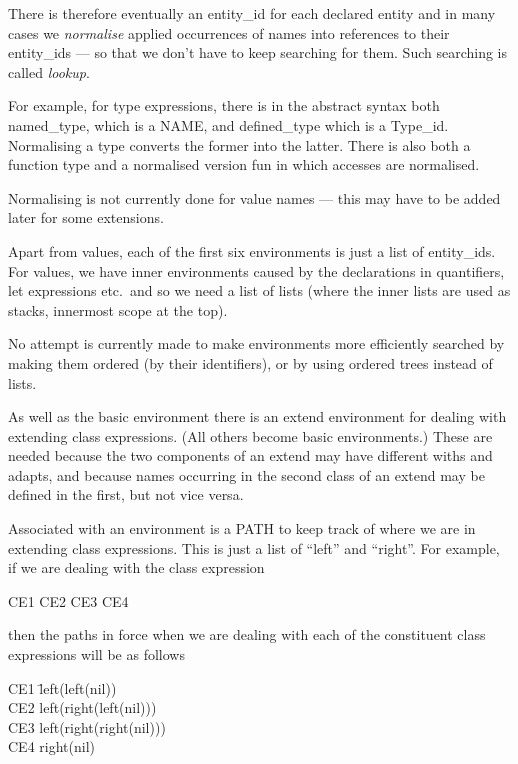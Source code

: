 \documentclass[a4paper]{article}
\begin{document}
There is therefore eventually an entity\_id for each declared entity
and in many cases we \emph{normalise} applied occurrences of names
into references to their entity\_ids --- so that we don't have to keep
searching for them.  Such searching is called \emph{lookup}.  

For example, for type expressions, there is in the abstract syntax
both named\_type, which is a NAME, and defined\_type which is a
Type\_id.  Normalising a type converts the former into the latter.
There is also both a function type and a normalised version fun in which
accesses are normalised.  

Normalising is not currently done for value names --- this may have to
be added later for some extensions.

Apart from values, each of the first six environments is just a list
of entity\_ids.  For values, we have inner environments caused by the
declarations in quantifiers, let expressions etc.\ and so we need a
list of lists (where the inner lists are used as stacks, innermost
scope at the top).

No attempt is currently made to make environments more efficiently searched by
making them ordered (by their identifiers), or by using ordered trees
instead of lists. 

As well as the basic environment there is an extend environment for
dealing with extending class expressions.  (All others become basic
environments.)  These are needed because the two components of an
extend may have different withs and adapts, and because names
occurring in the second class of an extend may be defined in the
first, but not vice versa.  

Associated with an environment is a PATH to keep track of where we are
in extending class expressions.  This is just a list of ``left'' and
``right''.  For example, if we are dealing with the class
expression

  CE1   CE2  CE3  CE4

then the paths in force when we are dealing with each of the
constituent class expressions will be as follows

\begin{tabbing}
  CE1 \= left(left(nil)) \\
  CE2 \> left(right(left(nil))) \\
  CE3 \> left(right(right(nil))) \\
  CE4 \> right(nil) 
\end{tabbing}
\end{document}
